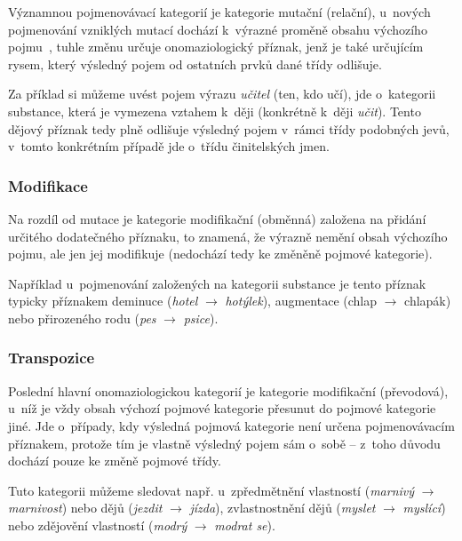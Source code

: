 Významnou pojmenovávací kategorií je kategorie mutační (relační),
u~nových pojmenování vzniklých mutací dochází k~výrazné proměně obsahu
výchozího pojmu~\parencite[102]{dokulil00}, tuhle změnu určuje
onomaziologický příznak, jenž je také určujícím rysem, který výsledný
pojem od ostatních prvků dané třídy odlišuje.~\parencite{enc-mutace17}

Za příklad si můžeme uvést pojem výrazu \emph{učitel} (ten, kdo učí),
jde o~kategorii substance, která je vymezena vztahem k~ději (konkrétně
k~ději \emph{učit}). Tento dějový příznak tedy plně odlišuje výsledný
pojem v~rámci třídy podobných jevů, v~tomto konkrétním případě jde
o~třídu činitelských jmen.

\hypertarget{modifikace}{%
\subsubsection{Modifikace}\label{modifikace}}

Na rozdíl od mutace je kategorie modifikační (obměnná) založena na
přidání určitého dodatečného příznaku, to znamená, že výrazně nemění
obsah výchozího pojmu, ale jen jej modifikuje (nedochází tedy ke změněně
pojmové kategorie).~\parencite[102]{dokulil00}

Například u~pojmenování založených na kategorii substance je tento
příznak typicky příznakem deminuce (\emph{hotel} $\rightarrow$
\emph{hotýlek}), augmentace (chlap $\rightarrow$ chlapák) nebo
přirozeného rodu (\emph{pes} $\rightarrow$ \emph{psice}).

\hypertarget{transpozice}{%
\subsubsection{Transpozice}\label{transpozice}}

Poslední hlavní onomaziologickou kategorií je kategorie modifikační
(převodová), u~níž je vždy obsah výchozí pojmové kategorie přesunut do
pojmové kategorie jiné. Jde o~případy, kdy výsledná pojmová kategorie
není určena pojmenovávacím příznakem, protože tím je vlastně výsledný
pojem sám o~sobě -- z~toho důvodu dochází pouze ke změně pojmové třídy.
\parencite[103]{dokulil00}

Tuto kategorii můžeme sledovat např. u~zpředmětnění vlastností
(\emph{marnivý} $\rightarrow$ \emph{marnivost}) nebo dějů
(\emph{jezdit} $\rightarrow$ \emph{jízda}), zvlastnostnění dějů
(\emph{myslet} $\rightarrow$ \emph{myslící}) nebo zdějovění
vlastností (\emph{modrý} $\rightarrow$ \emph{modrat se}).

